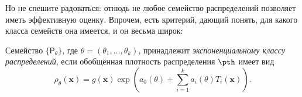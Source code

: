    

Но не спешите радоваться: отнюдь не любое семейство распределений позволяет иметь эффективную оценку. Впрочем, есть критерий, дающий понять, для какого класса семейств она имеется, и он весьма широк:

\begin{definition}
    Семейство $\{\mathsf P_{\theta}\}$, где $\theta = (\theta_1, \ldots, \theta_k)$, принадлежит \textit{экспоненциальному классу распределений}, если обобщённая плотность распределения $\pth$ имеет вид
    \[
    \rho_{\theta}(\mathbf{x}) = g(\mathbf{x}) \exp\left(a_0(\theta)+\sum_{i=1}^{k} a_i(\theta) T_i(\mathbf{x})\right).
    \]
\end{definition}

